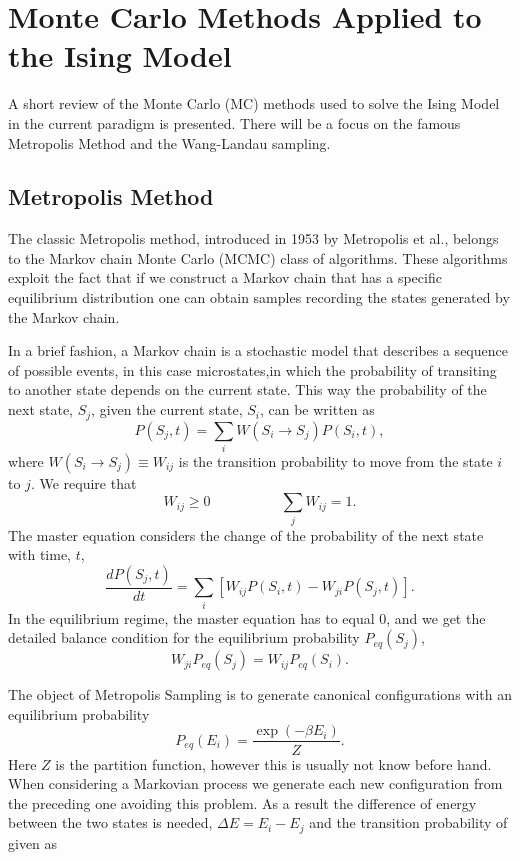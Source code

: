 \chapter{Monte Carlo Methods Applied to the Ising Model}

A short review of the Monte Carlo (MC) methods used to solve the Ising Model in the current paradigm is presented. There will be a focus on the famous Metropolis Method and the Wang-Landau sampling. 

\section{Metropolis Method}

The classic Metropolis method, introduced in 1953 by Metropolis et al., belongs to the Markov chain Monte Carlo (MCMC) class of algorithms. These algorithms exploit the fact that if we construct a Markov chain that has a specific equilibrium distribution one can obtain samples recording the states generated by the Markov chain. 

In a brief fashion, a Markov chain is a stochastic model that describes a sequence of possible events, in this case microstates,in which the probability of transiting to another state depends on the current state. This way the probability of the next state, $S_j$, given the current state, $S_i$, can be written as 
\begin{equation}
	P(S_j, t) = \sum_i W(S_i \rightarrow S_j) P(S_i, t),
\end{equation}
where $W(S_i \rightarrow S_j) \equiv W_{ij}$ is the transition probability to move from the state $i$ to $j$. We require that 
\begin{equation}
	W_{ij}  \geq 0 \quad \quad \quad \quad \quad \sum_j W_{ij}=1.
\end{equation}
The master equation considers the change of the probability of the next state with time, $t$,
\begin{equation}
	\frac{dP(S_j, t)}{dt} = \sum_i \left[ W_{ij}P(S_i, t) - W_{ji} P(S_j,t)  \right].
\end{equation}
In the equilibrium regime, the master equation has to equal $0$, and we get the detailed balance condition for the equilibrium probability $P_{eq}(S_j)$,
\begin{equation}
	W_{ji}P_{eq}(S_j) = W_{ij}P_{eq}(S_i).
\end{equation}

The object of Metropolis Sampling is to generate canonical configurations with an equilibrium probability
\begin{equation} \label{eq:met_prob_eq}
	P_{eq}(E_i) = \frac{\exp(-\beta E_i)}{Z}.
\end{equation}
Here $Z$ is the partition function, however this is usually not know before hand. When considering a Markovian process we generate each new configuration from the preceding one avoiding this problem. As a result the difference of energy between the two states is needed, $\Delta E = E_i - E_j$ and the transition probability of given as

